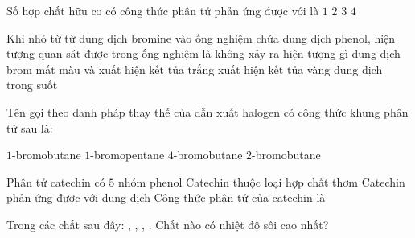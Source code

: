\documentclass[12pt,a4paper]{article}
\begin{document}
\begin{ex}
Số hợp chất hữu cơ có công thức phân tử  phản ứng được với  là
\choice
{$1$}
{\True $2$}
{$3$}
{$4$}
\loigiai{}
\end{ex}

\begin{ex}
Khi nhỏ từ từ dung dịch bromine vào ống nghiệm chứa dung dịch phenol, hiện tượng quan sát được trong ống nghiệm là
\choice
{không xảy ra hiện tượng gì}
{\True dung dịch brom mất màu và xuất hiện kết tủa trắng}
{xuất hiện kết tủa vàng}
{dung dịch trong suốt}
\loigiai{}
\end{ex}

\begin{ex}
Tên gọi theo danh pháp thay thế của dẫn xuất halogen có công thức khung phân tử sau là:
\begin{center}
\end{center}
\choice
{\True $1$-bromobutane}
{$1$-bromopentane}
{$4$-bromobutane}
{$2$-bromobutane}
\loigiai{}
\end{ex}

\begin{ex}
\choice
{\True Phân tử catechin có $5$ nhóm  phenol}
{Catechin thuộc loại hợp chất thơm}
{Catechin phản ứng được với dung dịch }
{Công thức phân tử của catechin là }
\loigiai{}
\end{ex}

\begin{ex}
Trong các chất sau đây: , , , . Chất nào có nhiệt độ sôi cao nhất?
\choice
{}
{}
{\True {}}
{}
\loigiai{}
\end{ex}
\end{document}
